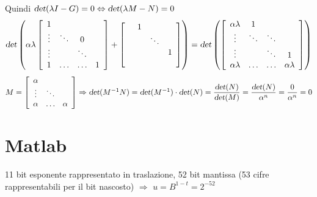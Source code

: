 \documentclass[10pt]{book}
\begin{document}
Quindi $\textsl{det}(\lambda I - G) = 0 \Leftrightarrow \textsl{det}(\lambda M - N) = 0$
$$\textsl{det}\left(\alpha\lambda\left[\begin{array}{c c c c}
1 &  & & \\
\vdots & \ddots & 0\\
\vdots & & \ddots & \\
1 & \ldots & \ldots & 1
\end{array}\right] + \left[\begin{array}{c c c c}
 & 1 & & \\
 &  &\ddots   \\
 & &  & 1 \\
 &  &  & 
\end{array}\right]\right) = \textsl{det}\left(\left[\begin{array}{c c c c}
\alpha\lambda & 1  & & \\
\vdots & \ddots & \ddots\\
\vdots & & \ddots & 1\\
\alpha\lambda & \ldots & \ldots & \alpha\lambda
\end{array}\right]\right)$$
$M = \left[\begin{array}{c c c}
\alpha\\
\vdots & \ddots\\
\alpha & \ldots & \alpha
\end{array}\right] \Rightarrow \textsl{det}(M^{-1}N) = \textsl{det}(M^{-1})\cdot\textsl{det}(N) = \mathlarger{\frac{\textsl{det}(N)}{\textsl{det}(M)}} = \mathlarger{\frac{\textsl{det}(N)}{\alpha^n}} = \mathlarger{\frac{0}{\alpha^n}} = 0$
\chapter{Matlab}
11 bit esponente rappresentato in traslazione, 52 bit mantissa (53 cifre rappresentabili per il bit nascosto) $\Rightarrow$ $u = B^{1-t} = 2^{-52}$
\end{document}
